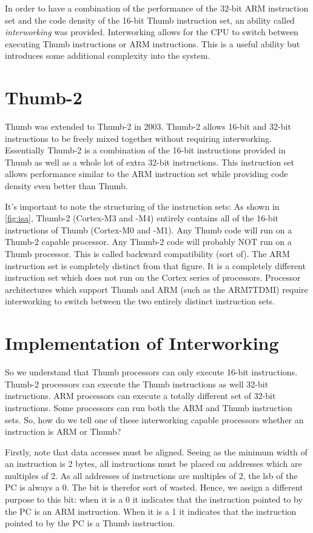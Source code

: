In order to have a combination of the performance of the 32-bit ARM instruction set and the code density of the 16-bit Thumb instruction set, an ability called \emph{interworking} was provided. Interworking allows for the CPU to switch between executing Thumb instructions or ARM instructions. This is a useful ability but introduces some additional complexity into the system.

\section{Thumb-2}
Thumb was extended to Thumb-2 in 2003. Thumb-2 allows 16-bit and 32-bit instructions to be freely mixed together without requiring interworking. Essentially Thumb-2 is a combination of the 16-bit instructions provided in Thumb as well as a whole lot of extra 32-bit instructions. This instruction set allows performance similar to the ARM instruction set while providing code density even better than Thumb. 

It's important to note the structuring of the instruction sets: As shown in \autoref{fig:isa}, Thumb-2 (Cortex-M3 and -M4) entirely contains all of the 16-bit instructions of Thumb (Cortex-M0 and -M1). Any Thumb code will run on a Thumb-2 capable processor. Any Thumb-2 code will probably NOT run on a Thumb processor. This is called backward compatibility (sort of). The ARM instruction set is completely distinct from that figure. It is a completely different instruction set which does not run on the Cortex series of processors. Processor architectures which support Thumb and ARM (such as the ARM7TDMI) require interworking to switch between the two entirely distinct instruction sets.

\section{Implementation of Interworking}
So we understand that Thumb processors can only execute 16-bit instructions. Thumb-2 processors can execute the Thumb instructions as well 32-bit instructions. ARM processors can execute a totally different set of 32-bit instructions. Some processors can run both the ARM and Thumb instruction sets. So, how do we tell one of these interworking capable processors whether an instruction is ARM or Thumb?

Firstly, note that data accesses must be aligned. Seeing as the minimum width of an instruction is 2 bytes, all instructions must be placed on  addresses which are multiples of 2. As all addresses of instructions are multiples of 2, the lsb of the PC is always a 0. The bit is therefor sort of wasted. Hence, we assign a different purpose to this bit: when it is a 0 it indicates that the instruction pointed to by the PC is an ARM instruction. When it is a 1 it indicates that the instruction pointed to by the PC is a Thumb instruction. 

